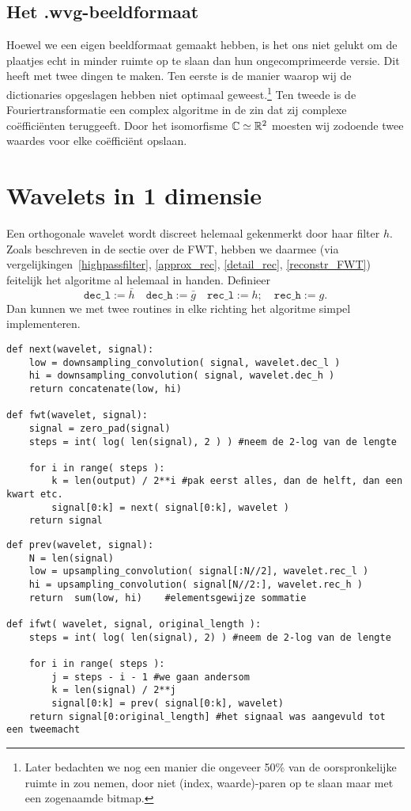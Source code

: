\subsection{Het .wvg-beeldformaat}
Hoewel we een eigen beeldformaat gemaakt hebben, is het ons niet gelukt om de plaatjes echt in minder ruimte op te slaan dan hun ongecomprimeerde versie. Dit heeft met twee dingen te maken. Ten eerste is de manier waarop wij de dictionaries opgeslagen hebben niet optimaal geweest.\footnote{Later bedachten we nog een manier die ongeveer 50\% van de oorspronkelijke ruimte in zou nemen, door niet (index, waarde)-paren op te slaan maar met een zogenaamde bitmap.} Ten tweede is de Fouriertransformatie een complex algoritme in de zin dat zij complexe co\"effici\"enten teruggeeft. Door het isomorfisme $\mathbb{C} \simeq \mathbb{R}^2$ moesten wij zodoende twee waardes voor elke co\"effici\"ent opslaan.

\section{Wavelets in 1 dimensie}
Een orthogonale wavelet wordt discreet helemaal gekenmerkt door haar filter $h$. Zoals beschreven in de sectie over de FWT, hebben we daarmee (via vergelijkingen~\ref{highpassfilter}, \ref{approx_rec}, \ref{detail_rec}, \ref{reconstr_FWT}) feitelijk het algoritme al helemaal in handen. Definieer
\[
	\texttt{dec\_l} := \bar{h} \quad \texttt{dec\_h} := \bar{g} \quad 
        \texttt{rec\_l} := h; \quad \texttt{rec\_h} := g.
\]
Dan kunnen we met twee routines in elke richting het algoritme simpel implementeren.
\begin{lstlisting}[caption=De FWT]
def next(wavelet, signal):
	low = downsampling_convolution( signal, wavelet.dec_l )
	hi = downsampling_convolution( signal, wavelet.dec_h )
	return concatenate(low, hi)
	
def fwt(wavelet, signal):
	signal = zero_pad(signal)
	steps = int( log( len(signal), 2 ) ) #neem de 2-log van de lengte
	
	for i in range( steps ):
		k = len(output) / 2**i #pak eerst alles, dan de helft, dan een kwart etc.
		signal[0:k] = next( signal[0:k], wavelet )
	return signal
\end{lstlisting}
\begin{lstlisting}[caption=De iFWT]
def prev(wavelet, signal):
	N = len(signal)
	low = upsampling_convolution( signal[:N//2], wavelet.rec_l )
	hi = upsampling_convolution( signal[N//2:], wavelet.rec_h )
	return  sum(low, hi) 	#elementsgewijze sommatie
	
def ifwt( wavelet, signal, original_length ):
	steps = int( log( len(signal), 2) ) #neem de 2-log van de lengte
	
	for i in range( steps ):
		j = steps - i - 1 #we gaan andersom
		k = len(signal) / 2**j
		signal[0:k] = prev( signal[0:k], wavelet)
	return signal[0:original_length] #het signaal was aangevuld tot een tweemacht

\end{lstlisting}

